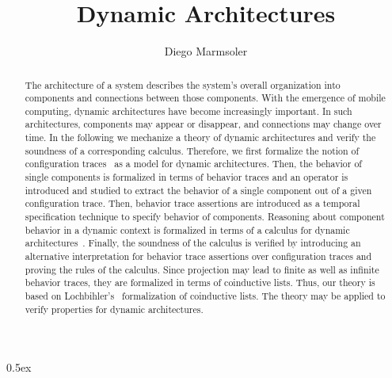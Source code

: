 \documentclass[11pt,a4paper]{article}
\begin{document}
\title{Dynamic Architectures%
}
\author{Diego Marmsoler}
\maketitle

\begin{abstract}
	The architecture of a system describes the system's overall organization into components and connections between those components.
	With the emergence of mobile computing, dynamic architectures have become increasingly important.
	In such architectures, components may appear or disappear, and connections may change over time.
	In the following we mechanize a theory of dynamic architectures and verify the soundness of a corresponding calculus.
	Therefore, we first formalize the notion of configuration traces~\cite{Marmsoler2016} as a model for dynamic architectures.
	Then, the behavior of single components is formalized in terms of behavior traces and an operator is introduced and studied to extract the behavior of a single component out of a given configuration trace.
	Then, behavior trace assertions are introduced as a temporal specification technique to specify behavior of components.
	Reasoning about component behavior in a dynamic context is formalized in terms of a calculus for dynamic architectures~\cite{Marmsoler2017c}.
	Finally, the soundness of the calculus is verified by introducing an alternative interpretation for behavior trace assertions over configuration traces and proving the rules of the calculus.
	Since projection may lead to finite as well as infinite behavior traces, they are formalized in terms of coinductive lists.
	Thus, our theory is based on Lochbihler's~\cite{Lochbihler2010} formalization of coinductive lists.
	The theory may be applied to verify properties for dynamic architectures.
\end{abstract}
\newpage

\tableofcontents
\newpage

\parindent 0pt\parskip 0.5ex





\end{document}
